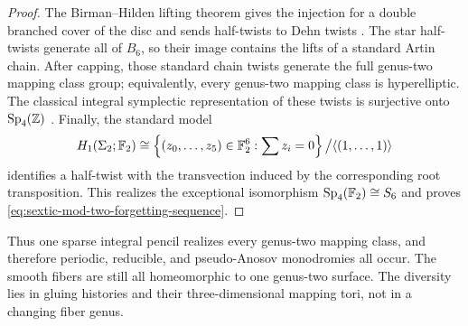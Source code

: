 \begin{proof}
The Birman--Hilden lifting theorem gives the injection for a double branched
cover of the disc and sends half-twists to Dehn twists
\cite{BirmanHilden1973Isotopies}.  The star half-twists generate all of $B_6$,
so their image contains the lifts of a standard Artin chain.  After capping,
those standard chain twists generate the full genus-two mapping class group;
equivalently, every genus-two mapping class is hyperelliptic.  The classical
integral symplectic representation of these twists is surjective onto
$\operatorname{Sp}_4(\mathbb{Z})$
\cite{ACampo1979Tresses}.  Finally, the standard model
\begin{equation}
 H_1(\Sigma_2;\mathbb{F}_2)
 \cong
 \left\{(z_0,\ldots,z_5)\in\mathbb{F}_2^6:\sum z_i=0\right\}
 \big/\langle(1,\ldots,1)\rangle
 \label{eq:genus-two-mod-two-root-model}
\end{equation}
identifies a half-twist with the transvection induced by the corresponding
root transposition.  This realizes the exceptional isomorphism
$\operatorname{Sp}_4(\mathbb{F}_2)\cong S_6$ and proves
\eqref{eq:sextic-mod-two-forgetting-sequence}.
\end{proof}

Thus one sparse integral pencil realizes every genus-two mapping class, and
therefore periodic, reducible, and pseudo-Anosov monodromies all occur.  The
smooth fibers are still all homeomorphic to one genus-two surface.  The
diversity lies in gluing histories and their three-dimensional mapping tori,
not in a changing fiber genus.

